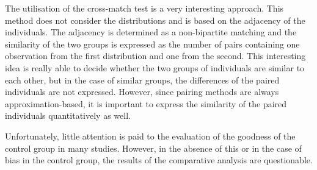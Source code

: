 


The utilisation of the cross-match test \cite{rosenbaum2005exact} is a very interesting approach. This method does not consider the distributions and is based on the adjacency of the individuals. The adjacency is determined as a non-bipartite matching and the similarity of the two groups is expressed as the number of pairs containing one observation from the first distribution and one from the second. This interesting idea is really able to decide whether the two groups of individuals are similar to each other, but in the case of similar groups, the differences of the paired individuals are not expressed. However, since pairing methods are always approximation-based, it is important to express the similarity of the paired individuals quantitatively as well. 

Unfortunately, little attention is paid to the evaluation of the goodness of the control group in many studies. However, in the absence of this or in the case of bias in the control group, the results of the comparative analysis are questionable.




